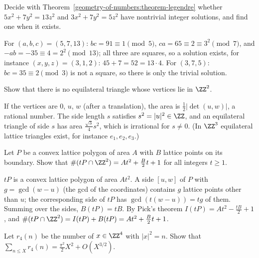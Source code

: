 \begin{exercise}\label{geometry-of-numbers:exercise-legendre-examples}
Decide with Theorem~\ref{geometry-of-numbers:theorem-legendre} whether $5x^2 + 7y^2 = 13z^2$ and $3x^2 + 7y^2 = 5z^2$ have nontrivial integer solutions, and find one when it exists.
\end{exercise}

\begin{solution}
For $(a, b, c) = (5, 7, 13)$: $bc = 91 \equiv 1 \pmod 5$, $ca = 65 \equiv 2 \equiv 3^2 \pmod 7$, and $-ab = -35 \equiv 4 = 2^2 \pmod{13}$; all three are squares, so a solution exists, for instance
$(x, y, z) = (3, 1, 2)$: $45 + 7 = 52 = 13 \cdot 4$. For $(3, 7, 5)$: $bc = 35 \equiv 2 \pmod 3$ is not a square, so there is only the trivial solution.
\end{solution}

\begin{exercise}\label{geometry-of-numbers:exercise-pick-equilateral}
Show that there is no equilateral triangle whose vertices lie in $\ZZ^2$.
\end{exercise}

\begin{solution}
If the vertices are $0$, $u$, $w$ (after a translation), the area is $\frac12|\det(u, w)|$, a rational number. The side length $s$ satisfies $s^2 = |u|^2 \in \ZZ$, and an equilateral triangle of side $s$ has area
$\frac{\sqrt3}{4}s^2$, which is irrational for $s \neq 0$. (In $\ZZ^3$ equilateral lattice triangles exist, for instance $e_1, e_2, e_3$.)
\end{solution}

\begin{exercise}\label{geometry-of-numbers:exercise-ehrhart-polygon}
Let $P$ be a convex lattice polygon of area $A$ with $B$ lattice points on its boundary. Show that $\#(tP \cap \ZZ^2) = At^2 + \frac B2t + 1$ for all integers $t \geq 1$.
\end{exercise}

\begin{solution}
$tP$ is a convex lattice polygon of area $At^2$. A side $[u, w]$ of $P$ with $g = \gcd(w - u) $ (the gcd of the coordinates) contains $g$ lattice points other than $u$; the corresponding side of $tP$ has
$\gcd(t(w - u)) = tg$ of them. Summing over the sides, $B(tP) = tB$. By Pick's theorem $I(tP) = At^2 - \frac{tB}{2} + 1$, and $\#(tP \cap \ZZ^2) = I(tP) + B(tP) = At^2 + \frac{B}{2}t + 1$.
\end{solution}

\begin{exercise}\label{geometry-of-numbers:exercise-r4-average}
Let $r_4(n)$ be the number of $x \in \ZZ^4$ with $|x|^2 = n$. Show that $\sum_{n \leq X}r_4(n) = \frac{\pi^2}{2}X^2 + O(X^{3/2})$.
\end{exercise}

